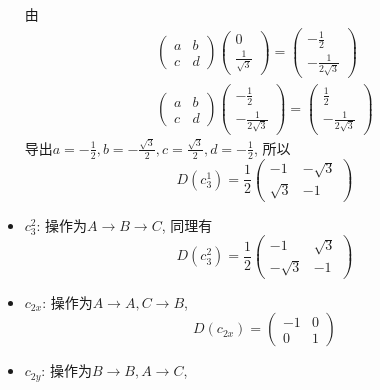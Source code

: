 \documentclass[UTF8]{ctexart}
\begin{document}
\begin{itemize}
由
\begin{gather}
  \begin{pmatrix}
    a & b \\
    c & d 
  \end{pmatrix}
  \begin{pmatrix}
    0 \\
    \frac{1}{\sqrt{3}}
  \end{pmatrix} =
  \begin{pmatrix}
    -\frac{1}{2} \\
    -\frac{1}{2\sqrt{3}}
  \end{pmatrix} \\
  \begin{pmatrix}
    a & b\\
    c & d
  \end{pmatrix}
  \begin{pmatrix}
    -\frac{1}{2} \\
    -\frac{1}{2\sqrt{3}}
  \end{pmatrix} =
  \begin{pmatrix}
    \frac{1}{2}\\
    -\frac{1}{2\sqrt{3}}
  \end{pmatrix}
\end{gather}
导出$a = -\frac{1}{2}, b = -\frac{\sqrt{3}}{2}, c = \frac{\sqrt{3}}{2}, d = -\frac{1}{2}$, 所以
\begin{equation}
  D(c_3^1) = \frac{1}{2}
  \begin{pmatrix}
    -1 & -\sqrt{3} \\
    \sqrt{3} & -1
  \end{pmatrix}
\end{equation}
\item $c_3^2$: 操作为$A\rightarrow B\rightarrow C$, 同理有
  \begin{equation}
    D(c_3^2) = \frac{1}{2}
    \begin{pmatrix}
      -1 & \sqrt{3} \\
      -\sqrt{3} & -1
    \end{pmatrix}
  \end{equation}
\item $c_{2x}$: 操作为$A \rightarrow A, C \rightarrow B$, 
  \begin{equation}
    D(c_{2x}) =
    \begin{pmatrix}
      -1 & 0 \\
      0 & 1
    \end{pmatrix}
  \end{equation}
\item $c_{2y}$: 操作为$B \rightarrow B, A \rightarrow C$, 

\end{itemize}
\end{document}
